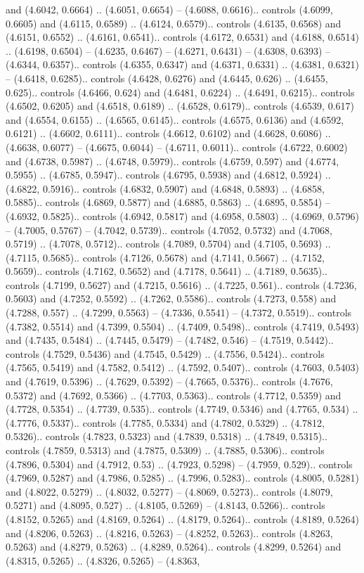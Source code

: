 and (4.6042, 0.6664) .. (4.6051, 0.6654) -- (4.6088, 0.6616).. controls (4.6099, 0.6605) and (4.6115, 0.6589) .. (4.6124, 0.6579).. controls (4.6135, 0.6568) and (4.6151, 0.6552) .. (4.6161, 0.6541).. controls (4.6172, 0.6531) and (4.6188, 0.6514) .. (4.6198, 0.6504) -- (4.6235, 0.6467) -- (4.6271, 0.6431) -- (4.6308, 0.6393) -- (4.6344, 0.6357).. controls (4.6355, 0.6347) and (4.6371, 0.6331) .. (4.6381, 0.6321) -- (4.6418, 0.6285).. controls (4.6428, 0.6276) and (4.6445, 0.626) .. (4.6455, 0.625).. controls (4.6466, 0.624) and (4.6481, 0.6224) .. (4.6491, 0.6215).. controls (4.6502, 0.6205) and (4.6518, 0.6189) .. (4.6528, 0.6179).. controls (4.6539, 0.617) and (4.6554, 0.6155) .. (4.6565, 0.6145).. controls (4.6575, 0.6136) and (4.6592, 0.6121) .. (4.6602, 0.6111).. controls (4.6612, 0.6102) and (4.6628, 0.6086) .. (4.6638, 0.6077) -- (4.6675, 0.6044) -- (4.6711, 0.6011).. controls (4.6722, 0.6002) and (4.6738, 0.5987) .. (4.6748, 0.5979).. controls (4.6759, 0.597) and (4.6774, 0.5955) .. (4.6785, 0.5947).. controls (4.6795, 0.5938) and (4.6812, 0.5924) .. (4.6822, 0.5916).. controls (4.6832, 0.5907) and (4.6848, 0.5893) .. (4.6858, 0.5885).. controls (4.6869, 0.5877) and (4.6885, 0.5863) .. (4.6895, 0.5854) -- (4.6932, 0.5825).. controls (4.6942, 0.5817) and (4.6958, 0.5803) .. (4.6969, 0.5796) -- (4.7005, 0.5767) -- (4.7042, 0.5739).. controls (4.7052, 0.5732) and (4.7068, 0.5719) .. (4.7078, 0.5712).. controls (4.7089, 0.5704) and (4.7105, 0.5693) .. (4.7115, 0.5685).. controls (4.7126, 0.5678) and (4.7141, 0.5667) .. (4.7152, 0.5659).. controls (4.7162, 0.5652) and (4.7178, 0.5641) .. (4.7189, 0.5635).. controls (4.7199, 0.5627) and (4.7215, 0.5616) .. (4.7225, 0.561).. controls (4.7236, 0.5603) and (4.7252, 0.5592) .. (4.7262, 0.5586).. controls (4.7273, 0.558) and (4.7288, 0.557) .. (4.7299, 0.5563) -- (4.7336, 0.5541) -- (4.7372, 0.5519).. controls (4.7382, 0.5514) and (4.7399, 0.5504) .. (4.7409, 0.5498).. controls (4.7419, 0.5493) and (4.7435, 0.5484) .. (4.7445, 0.5479) -- (4.7482, 0.546) -- (4.7519, 0.5442).. controls (4.7529, 0.5436) and (4.7545, 0.5429) .. (4.7556, 0.5424).. controls (4.7565, 0.5419) and (4.7582, 0.5412) .. (4.7592, 0.5407).. controls (4.7603, 0.5403) and (4.7619, 0.5396) .. (4.7629, 0.5392) -- (4.7665, 0.5376).. controls (4.7676, 0.5372) and (4.7692, 0.5366) .. (4.7703, 0.5363).. controls (4.7712, 0.5359) and (4.7728, 0.5354) .. (4.7739, 0.535).. controls (4.7749, 0.5346) and (4.7765, 0.534) .. (4.7776, 0.5337).. controls (4.7785, 0.5334) and (4.7802, 0.5329) .. (4.7812, 0.5326).. controls (4.7823, 0.5323) and (4.7839, 0.5318) .. (4.7849, 0.5315).. controls (4.7859, 0.5313) and (4.7875, 0.5309) .. (4.7885, 0.5306).. controls (4.7896, 0.5304) and (4.7912, 0.53) .. (4.7923, 0.5298) -- (4.7959, 0.529).. controls (4.7969, 0.5287) and (4.7986, 0.5285) .. (4.7996, 0.5283).. controls (4.8005, 0.5281) and (4.8022, 0.5279) .. (4.8032, 0.5277) -- (4.8069, 0.5273).. controls (4.8079, 0.5271) and (4.8095, 0.527) .. (4.8105, 0.5269) -- (4.8143, 0.5266).. controls (4.8152, 0.5265) and (4.8169, 0.5264) .. (4.8179, 0.5264).. controls (4.8189, 0.5264) and (4.8206, 0.5263) .. (4.8216, 0.5263) -- (4.8252, 0.5263).. controls (4.8263, 0.5263) and (4.8279, 0.5263) .. (4.8289, 0.5264).. controls (4.8299, 0.5264) and (4.8315, 0.5265) .. (4.8326, 0.5265) -- (4.8363, 